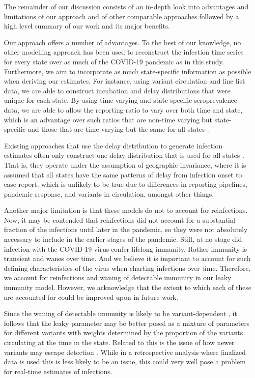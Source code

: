 \documentclass{article}
\begin{document}
The remainder of our discussion consists of an in-depth look into advantages and limitations of our approach and of other comparable approaches followed by a high level summary of our work and its major benefits. %

Our approach offers a number of advantages. To the best of our knowledge, no other modelling approach has been used to reconstruct the infection time series for every state over as much of the COVID-19 pandemic as in this study. Furthermore, we aim to incorporate as much state-specific information as possible when deriving our estimates. For instance, using variant circulation and line list data, we are able to construct incubation and delay distributions that were unique for each state. By using time-varying and state-specific seroprevalence data, we are able to allow the reporting ratio to vary over both time and state, which is an advantage over such ratios that are non-time varying but state-specific and those that are time-varying but the same for all states \citep{unwin2020state, uga2020covid19}.

Existing approaches that use the delay distribution to generate infection estimates often only construct one delay distribution that is used for all states \citep{chitwood2021reconstructing, jahja2022real}. That is, they operate under the assumption of geographic invariance, where it is assumed that all states have the same patterns of delay from infection onset to case report, which is unlikely to be true due to differences in reporting pipelines, pandemic response, and variants in circulation, amongst other things. 

Another major limitation is that these models do not to account for reinfections. Now, it may be contended that reinfections did not account for a substantial fraction of the infections until later in the pandemic, so they were not absolutely necessary to include in the earlier stages of the pandemic. Still, at no stage did infection with the COVID-19 virus confer lifelong immunity. Rather immunity is transient and wanes over time. And we believe it is important to account for such defining characteristics of the virus when charting infections over time. Therefore, we account for reinfections and waning of detectable immunity in our leaky immunity model. However, we acknowledge that the extent to which each of these are accounted for could be improved upon in future work. 

Since the waning of detectable immunity is likely to be variant-dependent \citep{pooley2023durability}, it follows that the leaky parameter may be better posed as a mixture of parameters for different variants with weights determined by the proportion of the variants circulating at the time in the state. Related to this is the issue of how newer variants may escape detection \citep{nih2022assessing, fda2023sars}. While in a retrospective analysis where finalized data is used this is less likely to be an issue, this could very well pose a problem for real-time estimates of infections.
\end{document}
